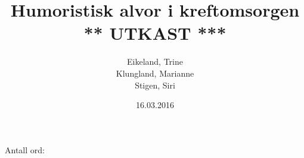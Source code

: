 \documentclass[a4paper,norsk,12pt]{report}
\begin{document}
  \author{Eikeland, Trine\\Klungland, Marianne\\Stigen, Siri}
  \date{16.03.2016}
  \title{Humoristisk alvor i kreftomsorgen \\
    {\Huge{\sffamily *** UTKAST ***}}}

  
  \begin{abstract}
  
  \end{abstract}

  \tableofcontents

  Antall ord: 
  \clearpage

  \renewcommand{\arraystretch}{1.2}

  
  
  
  
  
  
  
  \clearpage

  \begingroup %
  \raggedright %
  \nocite{*} %
  
  \endgroup %

  \appendix
  
  \clearpage %
  \printindex
\end{document}
